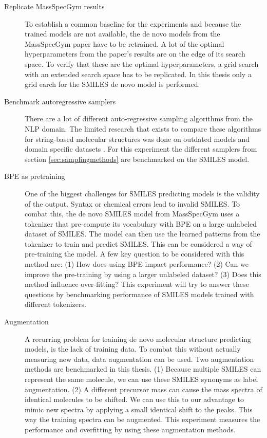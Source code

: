 \begin{description}
    \item[Replicate MassSpecGym results]
    To establish a common baseline for the experiments and because the trained models are not available, the de novo models from the MassSpecGym paper \cite{bushuiev2024massspecgym} have to be retrained.
    A lot of the optimal hyperparameters from the paper's results are on the edge of its search space.
    To verify that these are the optimal hyperparameters, a grid search with an extended search space has to be replicated.
    In this thesis only a grid earch for the SMILES de novo model is performed.
    
    \item[Benchmark autoregressive samplers]
    There are a lot of different auto-regressive sampling algorithms from the \ac{NLP} domain.
    The limited research that exists to compare these algorithms for string-based molecular structures was done on outdated models and domain specific datasets \cite{stravs2022msnovelist}.
    For this experiment the different samplers from section \ref{sec:samplingmethods} are benchmarked on the SMILES model.
    
    \item[\acf{BPE} as pretraining]
    One of the biggest challenges for SMILES predicting models is the validity of the output. Syntax or chemical errors lead to invalid SMILES.
    To combat this, the de novo SMILES model from MassSpecGym uses a tokenizer that pre-compute its vocabulary with \ac{BPE} on a large unlabeled dataset of SMILES.
    The model can then use the learned patterns from the tokenizer to train and predict SMILES.
    This can be considered a way of pre-training the model.
    A few key question to be considered with this method are: 
    (1) How does using \ac{BPE} impact performance?
    (2) Can we improve the pre-training by using a larger unlabeled dataset?
    (3) Does this method influence over-fitting?
    This experiment will try to answer these questions by benchmarking performance of SMILES models trained with different tokenizers.

    \item[Augmentation]
    A recurring problem for training de novo molecular structure predicting models, is the lack of training data.
    To combat this without actually measuring new data, data augmentation can be used. 
    Two augmentation methods are benchmarked in this thesis.
    (1) Because multiple SMILES can represent the same molecule, we can use these SMILES synonyms as label augmentation.
    (2) A different precursor mass can cause the mass spectra of identical molecules to be shifted.
    We can use this to our advantage to mimic new spectra by applying a small identical shift to the peaks.
    This way the training spectra can be augmented.
    This experiment measures the performance and overfitting by using these augmentation methods.


\end{description}
